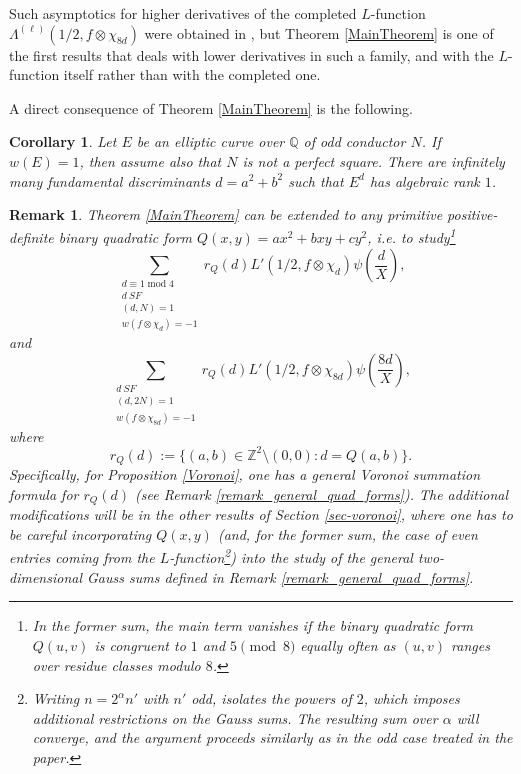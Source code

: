 \documentclass[12pt]{amsart}
\def\Z{\mathbb{Z}}
\def\Q{\mathbb{Q}}
\newtheorem{corollary}[theorem]{Corollary}
\newtheorem{remark}[theorem]{Remark}
\def\Z{\mathbb Z}
\def\Q{\mathbb Q}
\def\Z{\mathbb Z}
\def\Q{\mathbb Q}
\def\mod{\operatorname{mod}}
\begin{document}
Such asymptotics for higher derivatives of the completed $L$-function $\Lambda^{(\ell)
}(1/2,f\otimes\chi_{8d})$ were obtained in \cite{Munshi1}, but Theorem \ref{MainTheorem} is one of the first results that deals with lower derivatives in such a family, and with the $L$-function itself rather than with the completed one. 




A direct consequence of Theorem \ref{MainTheorem} is the following.

 \begin{corollary}\label{MainCorollary}
    Let $E$ be an elliptic curve over $\Q$ of odd conductor $N$. If $w(E)=1$, then assume also that $N$ is not a perfect square. There are infinitely many fundamental discriminants $d=a^2+b^2$ such that $E^d$ has algebraic rank $1$.
\end{corollary}

\begin{remark}
    Theorem \ref{MainTheorem} can be extended to any primitive positive-definite binary quadratic form $Q(x,y)=ax^2+bxy+cy^2$, %
    i.e. to study\footnote{In the former sum, the main term vanishes if the binary quadratic form $Q(u,v)$ is congruent to $1$ and $5 \pmod{8}$ equally often as $(u,v)$ ranges over residue classes modulo $8$.}
    $$ \sum_{\substack{d\equiv 1 \mod 4 \\ d \ SF\\(d,N)=1 \\w(f\otimes\chi_{d})=-1}}r_Q(d)L'(1/2,f\otimes\chi_{d})\psi\left(\frac{d}{X}\right), $$
    and
    $$ \sum_{\substack{ d \ SF\\(d,2N)=1 \\w(f\otimes\chi_{8d})=-1}}r_Q(d)L'(1/2,f\otimes\chi_{8d})\psi\left(\frac{8d}{X}\right), $$
    where
    $$ r_Q(d) := \{ (a,b)\in \Z^2 \setminus (0,0) : d=Q(a,b) \} .$$
    Specifically, for Proposition \ref{Voronoi}, one has a general Voronoi summation formula for $r_Q(d)$ (see Remark \ref{remark_general_quad_forms}). The additional modifications will be in the other results of Section \ref{sec-voronoi}, where one has to be careful incorporating $Q(x,y)$ (and, for the former sum, the case of even entries coming from the $L$-function\footnote{Writing $n=2^{\alpha}n'$ with $n'$ odd, isolates the powers of $2$, which imposes additional restrictions on the Gauss sums. The resulting sum over $\alpha$ will converge, and the argument proceeds similarly as in the odd case treated in the paper.}) into the study of the general two-dimensional Gauss sums defined in Remark \ref{remark_general_quad_forms}.
    
\end{remark}
\end{document}
